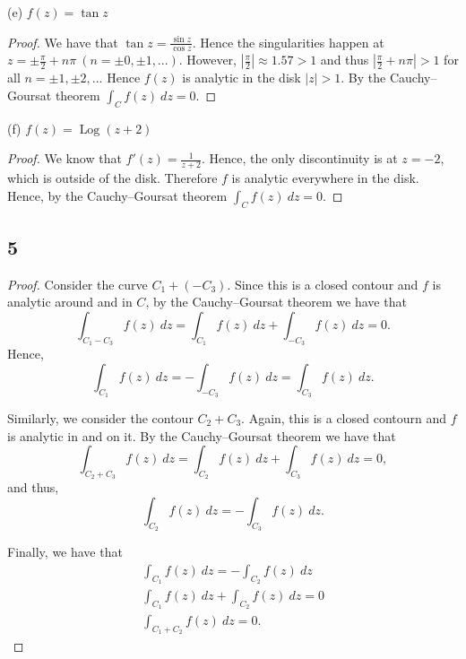 \documentclass{article}
\DeclareMathOperator*{\Log}{Log}
\begin{document}
(e) $f(z) = \tan z$
\begin{proof}
    We have that $\tan z = \frac{\sin z}{\cos z}$. Hence the singularities happen
    at $z = \pm \frac{\pi}{2} + n\pi \ (n = \pm 0, \pm 1,...)$. However,
    $|\frac{\pi}{2}| \approx 1.57 > 1$ and thus $|\frac{\pi}{2} + n\pi| > 1$ for all
    $n = \pm 1, \pm 2,...$ Hence $f(z)$ is analytic in the disk $|z| > 1$.
    By the Cauchy–Goursat theorem $\int_C f(z) \ dz = 0$.
\end{proof}

(f) $f(z) = \Log(z + 2)$
\begin{proof}
    We know that $f'(z) = \frac{1}{z + 2}$. Hence, the only discontinuity is at
    $z = -2$, which is outside of the disk. Therefore $f$ is analytic everywhere
    in the disk. Hence, by
    the Cauchy–Goursat theorem $\int_C f(z) \ dz = 0$.
\end{proof}

\subsection*{5}
\begin{proof}
    Consider the curve $C_1 + (-C_3)$. Since this is a closed contour and
    $f$ is analytic around and in $C$, by the Cauchy–Goursat theorem we have
    that
    \begin{equation*}
        \int_{C_1 - C_3} f(z) \ dz = \int_{C_1} f(z) \ dz + \int_{-C_3} f(z) \ dz = 0.
    \end{equation*}
    Hence,
    \begin{equation*}
        \int_{C_1} f(z) \ dz = -\int_{-C_3} f(z) \ dz = \int_{C_3} f(z) \ dz.
    \end{equation*}

    Similarly, we consider the contour $C_2 + C_3$. Again, this is a closed
    contourn and $f$ is analytic in and on it. By the Cauchy–Goursat theorem
    we have that
    \begin{equation*}
        \int_{C_2 + C_3} f(z) \ dz = \int_{C_2} f(z) \ dz + \int_{C_3} f(z) \ dz = 0,
    \end{equation*}
    and thus,
    \begin{equation*}
        \int_{C_2} f(z) \ dz = -\int_{C_3} f(z) \ dz.
    \end{equation*}

    Finally, we have that
    \begin{gather*}
        \int_{C_1} f(z) \ dz = -\int_{C_2} f(z) \ dz \\
        \int_{C_1} f(z) \ dz + \int_{C_2} f(z) \ dz  = 0\\
        \int_{C_1 + C_2} f(z) \ dz = 0.
    \end{gather*}
\end{proof}
\end{document}
